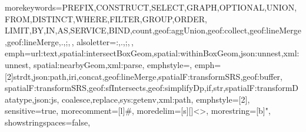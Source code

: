 \usepackage{svg}
\usepackage[scaled=.8,nomap]{FiraMono}
\usepackage{minted}
\usepackage{listings}
\usepackage{hyperref}
\lstset{basicstyle=\ttfamily}
{
  morekeywords={PREFIX,CONSTRUCT,SELECT,GRAPH,OPTIONAL,UNION,FROM,DISTINCT,WHERE,FILTER,GROUP,ORDER,%
  LIMIT,BY,IN,AS,SERVICE,BIND,count,geof:aggUnion,geof:collect,geof:lineMerge,geof:lineMerge,.,;,\,},
  alsoletter={:,.,;,\,},
  emph={url:text,spatial:intersectBoxGeom,spatial:withinBoxGeom,json:unnest,xml:unnest,%
  spatial:nearbyGeom,xml:parse},
  emphstyle={\bfseries\slshape},
  emph={[2]strdt,json:path,iri,concat,geof:lineMerge,spatialF:transformSRS,geof:buffer,%
  spatialF:transformSRS,geof:sfIntersects,geof:simplifyDp,if,str,spatialF:transformDatatype,json:js,%
  coalesce,replace,sys:getenv,xml:path},
  emphstyle={[2]\itshape},
  sensitive=true, %
  morecomment=[l]{\#}, %
  moredelim=[s][]{<}{>},
  morestring=[b]", %
  showstringspaces=false,
}
\newcommand\verbsparql[1]{\lstinline[keepspaces=true,language=SPARQL]{#1}}

\usepackage{caption}
\newenvironment{mintedlisting}{\captionsetup{type=lstlisting}}{}
\usepackage{cleveref}

\usepackage[base,ngerman,british]{babel}

\usepackage{relsize}
\newcommand{\CoyPu}{\textsc{\textsl{{\larger C\kern-1pt}oyPu}}\xspace}

